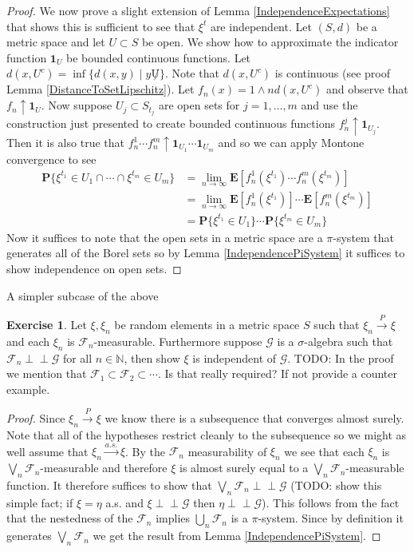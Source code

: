 \documentclass{amsbook}
\theoremstyle{definition}
\newtheorem{xca}{Exercise}
\theoremstyle{remark}
\newcommand{\Independent}{\perp \! \! \! \perp}
\newcommand{\expectation}[1]{\textbf{E}\left[#1\right]}
\newcommand{\probability}[1]{\textbf{P}\{#1\}}
\newcommand{\characteristic}[1]{\textbf{1}_{#1}}
\newcommand{\naturals}{\mathbb{N}}
\newcommand{\toprob}{\overset{P}\to}
\newcommand{\toas}{\overset{a.s.}\to}
\begin{document}
\begin{proof}
We now prove a slight extension of Lemma
\ref{IndependenceExpectations} that shows this is sufficient to see
that $\xi^t$ are independent.  Let $(S,d)$ be a metric space and let
$U \subset S$ be open.  We show how to approximate the indicator
function $\characteristic{U}$ be bounded continuous functions.  Let
$d(x, U^c) = \inf \lbrace d(x,y) \mid y \not U \rbrace$.  Note that
$d(x, U^c)$ is continuous (see proof Lemma
\ref{DistanceToSetLipschitz}).  Let $f_n(x) = 1 \wedge n d(x, U^c)$
and observe that $f_n \uparrow \characteristic{U}$.  Now suppose
$U_{j} \subset S_{t_j}$ are open sets for $j=1, \dotsc,m$ and use the
construction just presented to create bounded continuous functions
$f^j_n \uparrow \characteristic{U_j}$.  Then it is also true that
$f^1_n \dotsm f^m_n \uparrow \characteristic{U_1} \dotsm
\characteristic{U_m}$ and so we can apply Montone convergence to see 
\begin{align*}
\probability{\xi^{t_1} \in U_1 \cap \dotsb \cap \xi^{t_m} \in U_m} &=
\lim_{n \to \infty} \expectation{f^1_n(\xi^{t_1}) \dotsm
f^m_n(\xi^{t_m})} \\
&= \lim_{n \to \infty} \expectation{f^1_n(\xi^{t_1}) } \dotsm
\expectation{f^m_n(\xi^{t_m})} \\
&= \probability{\xi^{t_1} \in U_1} \dotsm\probability{\xi^{t_m} \in
  U_m} 
\end{align*}
Now it suffices to note that the open sets  in a metric space are a
$\pi$-system that generates all of the Borel sets so by Lemma
\ref{IndependencePiSystem} it suffices to
show independence on open sets.
\end{proof}

A simpler subcase of the above
\begin{xca}Let $\xi, \xi_n$ be random elements in a metric space $S$
  such that $\xi_n \toprob \xi$ and each $\xi_n$ is
  $\mathcal{F}_n$-measurable.  Furthermore suppose $\mathcal{G}$ is a
  $\sigma$-algebra such that $\mathcal{F}_n \Independent \mathcal{G}$
  for all $n \in \naturals$, then show $\xi$ is independent of
  $\mathcal{G}$.
TODO: In the proof we mention that $\mathcal{F}_1 \subset
\mathcal{F}_2 \subset \cdots$.  Is that really required?  If not
provide a counter example.
\end{xca}
\begin{proof}
Since $\xi_n \toprob \xi$ we know there is a subsequence  that
converges almost surely.  Note that all of the hypotheses restrict
cleanly to the subsequence so we might as well assume that $\xi_n
\toas \xi$.  By the $\mathcal{F}_n$ measurability of $\xi_n$ we see
that each $\xi_n$ is $\bigvee_n \mathcal{F}_n$-measurable and
therefore $\xi$ is almost surely equal to a $\bigvee_n
\mathcal{F}_n$-measurable function.  It therefore suffices to show
that $\bigvee_n
\mathcal{F}_n \Independent \mathcal{G}$ (TODO: show this simple fact; if $\xi
= \eta$ a.s. and $\xi \Independent \mathcal{G}$ then $\eta \Independent
\mathcal{G}$).  This follows from the fact
that the nestedness of the $\mathcal{F}_n$ implies $\bigcup_n
\mathcal{F}_n$ is a $\pi$-system.  Since by definition it generates $\bigvee_n
\mathcal{F}_n$ we get the result from Lemma \ref{IndependencePiSystem}.
\end{proof}
\end{document}
